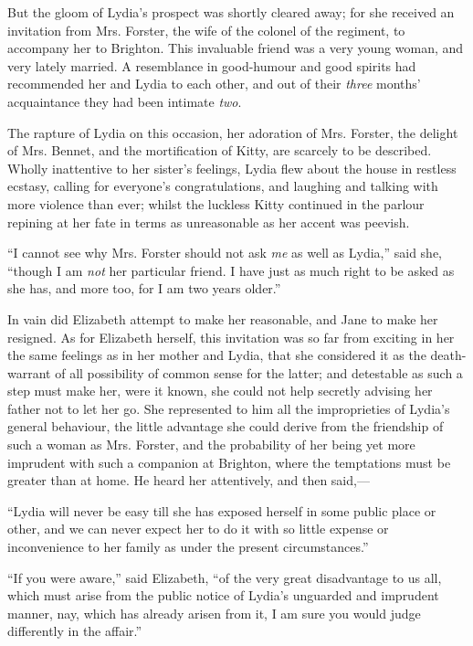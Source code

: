\documentclass[12pt,openright]{book}
\begin{document}
But the gloom of Lydia’s prospect was shortly cleared away; for she received an invitation from Mrs. Forster, the wife of the colonel of the regiment, to accompany her to Brighton. This invaluable friend was a very young woman, and very lately married. A resemblance in good-humour and good spirits had recommended her and Lydia to each other, and out of their \textit{three} months’ acquaintance they had been intimate \textit{two}.

The rapture of Lydia on this occasion, her adoration of Mrs. Forster, the delight of Mrs. Bennet, and the mortification of Kitty, are scarcely to be described. Wholly inattentive to her sister’s feelings, Lydia flew about the house in restless ecstasy, calling for everyone’s congratulations, and laughing and talking with more violence than ever; whilst the luckless Kitty continued in the parlour repining at her fate in terms as unreasonable as her accent was peevish.

“I cannot see why Mrs. Forster should not ask \textit{me} as well as Lydia,” said she, “though I am \textit{not} her particular friend. I have just as much right to be asked as she has, and more too, for I am two years older.”

In vain did Elizabeth attempt to make her reasonable, and Jane to make her resigned. As for Elizabeth herself, this invitation was so far from exciting in her the same feelings as in her mother and Lydia, that she considered it as the death-warrant of all possibility of common sense for the latter; and detestable as such a step must make her, were it known, she could not help secretly advising her father not to let her go. She represented to him all the improprieties of Lydia’s general behaviour, the little advantage she could derive from the friendship of such a woman as Mrs. Forster, and the probability of her being yet more imprudent with such a companion at Brighton, where the temptations must be greater than at home. He heard her attentively, and then said,—

“Lydia will never be easy till she has exposed herself in some public place or other, and we can never expect her to do it with so little expense or inconvenience to her family as under the present circumstances.”

“If you were aware,” said Elizabeth, “of the very great disadvantage to us all, which must arise from the public notice of Lydia’s unguarded and imprudent manner, nay, which has already arisen from it, I am sure you would judge differently in the affair.”
\end{document}
